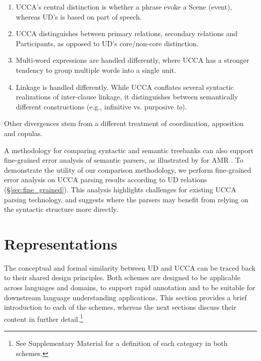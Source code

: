 \documentclass[11pt,a4paper]{article}
\begin{document}
  \begin{enumerate}[noitemsep]
      \item UCCA's central distinction is whether a phrase evoke a Scene (event),
        whereas UD's is based on part of speech. %
      \item UCCA distinguishes between primary relations, secondary relations
      and Participants, as opposed to UD's core/non-core distinction. %
      \item Multi-word expressions are handled differently,
        where UCCA has a stronger tendency to group multiple 
        words into a single unit. %
      \item Linkage is handled differently. While UCCA conflates several syntactic realizations of inter-clause linkage,
      it distinguishes between semantically different constructions
      (e.g., infinitive vs. purposive \textit{to}). %
   \end{enumerate}
    
   Other divergences stem from a different treatment of coordination, apposition and copulas.%
  
  
  A methodology for comparing syntactic and semantic treebanks can also support fine-grained error 
  analysis of semantic parsers, as illustrated by \citet{szubert2018structured} 
  for AMR \citep{banarescu2013abstract}.
  To demonstrate the utility of our comparison methodology,
  we perform fine-grained error analysis on UCCA parsing results
  according to UD relations (\S\ref{sec:fine_grained}).
  This analysis highlights challenges for existing UCCA parsing technology,
  and suggests where the parsers may benefit from relying on the syntactic structure more directly.



\section{Representations}\label{sec:representations}

  The conceptual and formal similarity between UD and UCCA can be traced back
  to their shared design principles.
  Both schemes are designed to be applicable across languages and domains, 
  to support rapid annotation and to be suitable for downstream language understanding
  applications. This section provides a brief introduction to each of the schemes, whereas
  the next sections discuss their content in further
  detail.\footnote{See Supplementary Material for a definition of each category in both schemes.}
  
\end{document}

